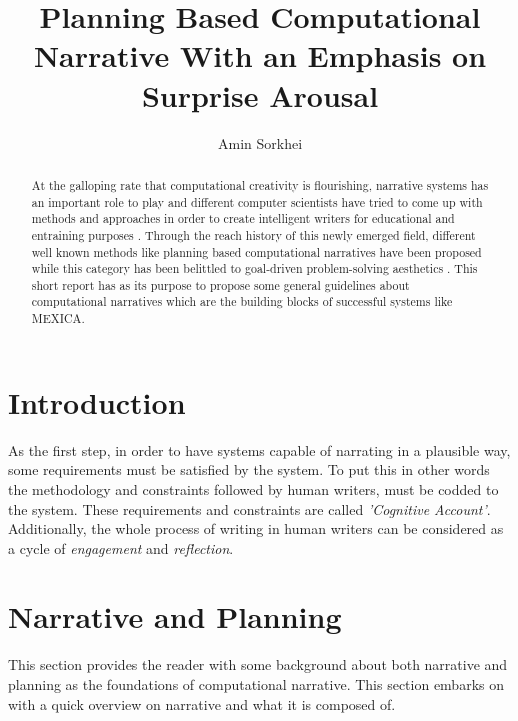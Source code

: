 \documentclass[english]{tktltiki}
\begin{document}
\onehalfspacing
\title{Planning Based Computational Narrative With an Emphasis on Surprise Arousal  }
\author{Amin Sorkhei}

\maketitle

\classification{}


\begin{abstract}
At the galloping rate that computational creativity is flourishing, narrative systems has an important role to play and different computer scientists have tried to come up with methods and approaches in order to create intelligent writers for educational and entraining purposes \cite{planning:2010:NPB:1946417.1946422}. Through the reach history of this newly emerged field, different well known methods like planning based computational narratives have been proposed while this category has been belittled to goal-driven problem-solving aesthetics \cite {analogy}. This short report has as its purpose to propose some general guidelines about computational narratives which are the building blocks of successful systems like MEXICA.
\end{abstract}

\mytableofcontents
\section{Introduction}
As the first step, in order to have systems capable of narrating in a plausible way, some requirements must be satisfied by the system. To put this in other words the methodology and constraints followed by human writers, must be codded to the system. These requirements and constraints are called \textit{'Cognitive Account'}. Additionally, the whole process of writing in human writers can be considered as a cycle of \textit{engagement} and \textit{reflection}. 
\section{Narrative and Planning}
This section provides the reader with some background about both narrative and planning as the foundations of computational narrative. This section embarks on with a quick overview on narrative and what it is composed of.
\end{document}

